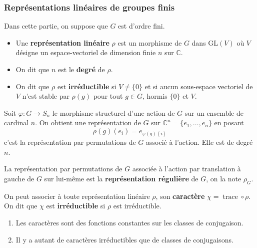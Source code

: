  \subsubsection{Représentations linéaires de groupes finis}


  Dans cette partie, on suppose que $G$ est d'ordre fini.

  \begin{definition}
    \begin{itemize}
      \item Une \textbf{représentation linéaire} $\rho$ est un morphisme de $G$ dans $\mathrm{GL}(V)$ où $V$ désigne un espace-vectoriel de dimension finie $n$ sur $\mathbb{C}$.
      \item On dit que $n$ est le \textbf{degré} de $\rho$.
      \item On dit que $\rho$ est \textbf{irréductible} si $V \neq \{ 0 \}$ et si aucun sous-espace vectoriel de $V$ n'est stable par $\rho(g)$ pour tout $g \in G$, hormis $\{ 0 \}$ et $V$.
    \end{itemize}
  \end{definition}

  \begin{example}
    Soit $\varphi : G \rightarrow S_n$ le morphisme structurel d'une action de $G$ sur un ensemble de cardinal $n$. On obtient une représentation de $G$ sur $\mathbb{C}^n = \{ e_1, \dots, e_n \}$ en posant
    \[ \rho(g)(e_i) = e_{\varphi(g)(i)} \]
    c'est la représentation par permutations de $G$ associé à l'action. Elle est de degré $n$.
  \end{example}

  \begin{definition}
    La représentation par permutations de $G$ associée à l'action par translation à gauche de $G$ sur lui-même est la \textbf{représentation régulière} de $G$, on la note $\rho_G$.
  \end{definition}


  \begin{definition}
    On peut associer à toute représentation linéaire $\rho$, son \textbf{caractère} $\chi = \operatorname{trace} \circ \rho$. On dit que $\chi$ est \textbf{irréductible} si $\rho$ est irréductible.
  \end{definition}

  \begin{proposition}
    \begin{enumerate}[label=(\roman*)]
      \item Les caractères sont des fonctions constantes sur les classes de conjugaison.
      \item Il y a autant de caractères irréductibles que de classes de conjugaisons.
    \end{enumerate}
  \end{proposition}

